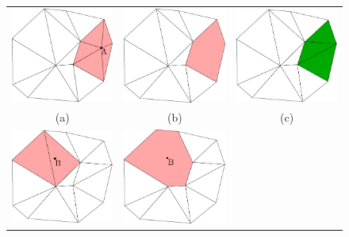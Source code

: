 \begin{figure}[t]
\centering
\begin{tabular}{ccc}
\includegraphics[width=0.33\columnwidth]{./img//delaunayExampleMoving01}&
\includegraphics[width=0.33\columnwidth]{./img//delaunayExampleMoving02}&
\includegraphics[width=0.33\columnwidth]{./img//delaunayExampleMoving03}\\
(a)&(b)&(c)\\
\includegraphics[width=0.33\columnwidth]{./img//delaunayExampleMoving04}&
\includegraphics[width=0.33\columnwidth]{./img//delaunayExampleMoving05}&

\end{tabular}
\end{figure}
